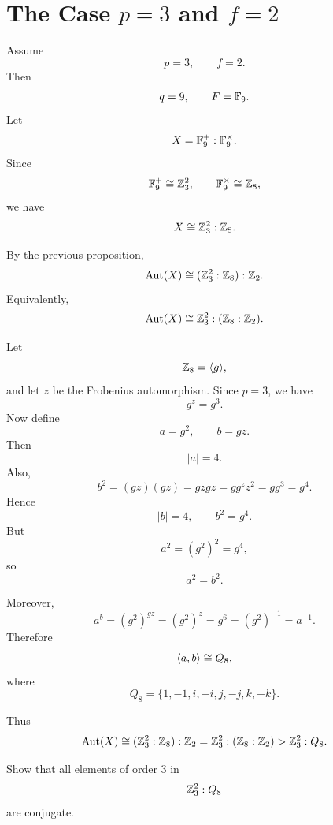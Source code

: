 \section{The Case \texorpdfstring{$p=3$}{p=3} and \texorpdfstring{$f=2$}{f=2}}

\begin{example}
Assume
\[
    p=3,
    \qquad
    f=2.
\]
Then
\[
    q=9,
    \qquad
    F=\mathbb{F}_9.
\]
Let
\[
    X=\mathbb{F}_9^+:\mathbb{F}_9^\times.
\]
Since
\[
    \mathbb{F}_9^+\cong \mathbb{Z}_3^2,
    \qquad
    \mathbb{F}_9^\times\cong \mathbb{Z}_8,
\]
we have
\[
    X\cong \mathbb{Z}_3^2:\mathbb{Z}_8.
\]

By the previous proposition,
\[
    \operatorname{Aut}(X)
    \cong
    (\mathbb{Z}_3^2:\mathbb{Z}_8):\mathbb{Z}_2.
\]
Equivalently,
\[
    \operatorname{Aut}(X)
    \cong
    \mathbb{Z}_3^2:(\mathbb{Z}_8:\mathbb{Z}_2).
\]

Let
\[
    \mathbb{Z}_8=\langle g\rangle,
\]
and let $z$ be the Frobenius automorphism. Since $p=3$, we have
\[
    g^z=g^3.
\]
Now define
\[
    a=g^2,
    \qquad
    b=gz.
\]
Then
\[
    |a|=4.
\]
Also,
\[
    b^2
    =
    (gz)(gz)
    =
    gzgz
    =
    gg^z z^2
    =
    gg^3
    =
    g^4.
\]
Hence
\[
    |b|=4,
    \qquad
    b^2=g^4.
\]
But
\[
    a^2=(g^2)^2=g^4,
\]
so
\[
    a^2=b^2.
\]

Moreover,
\[
    a^b
    =
    (g^2)^{gz}
    =
    (g^2)^z
    =
    g^6
    =
    (g^2)^{-1}
    =
    a^{-1}.
\]
Therefore
\[
    \langle a,b\rangle\cong Q_8,
\]
where
\[
    Q_8=\{1,-1,i,-i,j,-j,k,-k\}.
\]

Thus
\[
    \operatorname{Aut}(X)
    \cong
    (\mathbb{Z}_3^2:\mathbb{Z}_8):\mathbb{Z}_2
    =
    \mathbb{Z}_3^2:(\mathbb{Z}_8:\mathbb{Z}_2)
    >
    \mathbb{Z}_3^2:Q_8.
\]
\end{example}

\begin{exercise}
Show that all elements of order $3$ in
\[
    \mathbb{Z}_3^2:Q_8
\]
are conjugate.
\end{exercise}

